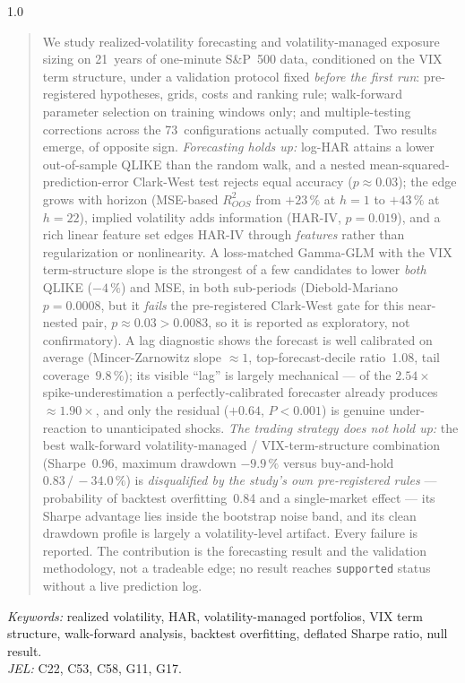 \documentclass[12pt,a4paper]{article}
\begin{document}
\begin{spacing}{1.0}
\begin{quote}\small
\hspace{1.5em}We study realized-volatility forecasting and volatility-managed exposure sizing on
21~years of one-minute S\&P~500 data, conditioned on the VIX term structure, under a validation
protocol fixed \emph{before the first run}: pre-registered hypotheses, grids, costs and ranking
rule; walk-forward parameter selection on training windows only; and multiple-testing corrections
across the 73~configurations actually computed. Two results emerge, of opposite sign.
\emph{Forecasting holds up:} log-HAR attains a lower out-of-sample QLIKE than the random walk, and
a nested mean-squared-prediction-error Clark-West test rejects equal accuracy ($p\approx0.03$); the
edge grows with horizon (MSE-based $R^2_{OOS}$ from $+23\,\%$ at $h{=}1$ to $+43\,\%$ at $h{=}22$),
implied volatility adds information (HAR-IV, $p=0.019$), and a rich linear feature set edges HAR-IV
through \emph{features} rather than regularization or nonlinearity. A loss-matched Gamma-GLM with
the VIX term-structure slope is the strongest of a few candidates to lower \emph{both} QLIKE ($-4\,\%$) and MSE, in
both sub-periods (Diebold-Mariano $p=0.0008$, but it \emph{fails} the pre-registered Clark-West gate for this near-nested pair, $p\approx0.03>0.0083$, so it is reported as exploratory, not confirmatory). A lag diagnostic shows the forecast is
well calibrated on average (Mincer-Zarnowitz slope $\approx1$, top-forecast-decile ratio~1.08, tail
coverage~$9.8\,\%$); its visible ``lag'' is largely mechanical --- of the $2.54\times$
spike-underestimation a perfectly-calibrated forecaster already produces $\approx1.90\times$, and
only the residual ($+0.64$, $P<0.001$) is genuine under-reaction to unanticipated shocks.
\emph{The trading strategy does not hold up:} the best walk-forward volatility-managed /
VIX-term-structure combination (Sharpe~0.96, maximum drawdown $-9.9\,\%$ versus buy-and-hold
$0.83\,/\,{-}34.0\,\%$) is \emph{disqualified by the study's own pre-registered rules} --- probability
of backtest overfitting~0.84 and a single-market effect --- its Sharpe advantage lies inside the
bootstrap noise band, and its clean drawdown profile is largely a volatility-level artifact. Every
failure is reported. The contribution is the forecasting result and the validation methodology, not
a tradeable edge; no result reaches \texttt{supported} status without a live prediction log.
\end{quote}

\vspace{0.4cm}
\noindent\small\textit{Keywords:} realized volatility, HAR, volatility-managed portfolios, VIX term
structure, walk-forward analysis, backtest overfitting, deflated Sharpe ratio, null result.\\
\textit{JEL:} C22, C53, C58, G11, G17.
\end{spacing}
\end{document}
